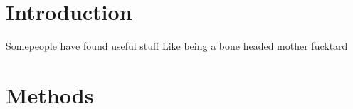 \section{Introduction}
Somepeople have found useful stuff \cite{Hilborn_1992}
Like being a bone headed mother fucktard
\section{Methods}